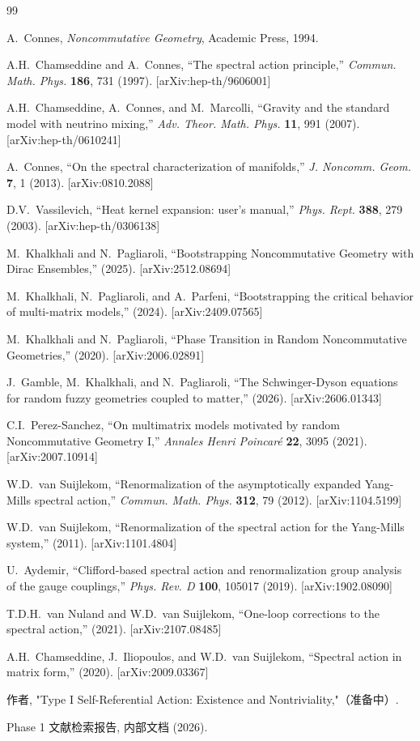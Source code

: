 \documentclass[11pt,a4paper]{ctexart}
\theoremstyle{remark}
\begin{document}
\begin{thebibliography}{99}

 A.~Connes, \textit{Noncommutative Geometry}, Academic Press, 1994.

 A.H.~Chamseddine and A.~Connes, ``The spectral action principle,'' \textit{Commun. Math. Phys.} \textbf{186}, 731 (1997). [arXiv:hep-th/9606001]

 A.H.~Chamseddine, A.~Connes, and M.~Marcolli, ``Gravity and the standard model with neutrino mixing,'' \textit{Adv. Theor. Math. Phys.} \textbf{11}, 991 (2007). [arXiv:hep-th/0610241]

 A.~Connes, ``On the spectral characterization of manifolds,'' \textit{J. Noncomm. Geom.} \textbf{7}, 1 (2013). [arXiv:0810.2088]

 D.V.~Vassilevich, ``Heat kernel expansion: user's manual,'' \textit{Phys. Rept.} \textbf{388}, 279 (2003). [arXiv:hep-th/0306138]

 M.~Khalkhali and N.~Pagliaroli, ``Bootstrapping Noncommutative Geometry with Dirac Ensembles,'' (2025). [arXiv:2512.08694]

 M.~Khalkhali, N.~Pagliaroli, and A.~Parfeni, ``Bootstrapping the critical behavior of multi-matrix models,'' (2024). [arXiv:2409.07565]

 M.~Khalkhali and N.~Pagliaroli, ``Phase Transition in Random Noncommutative Geometries,'' (2020). [arXiv:2006.02891]

 J.~Gamble, M.~Khalkhali, and N.~Pagliaroli, ``The Schwinger-Dyson equations for random fuzzy geometries coupled to matter,'' (2026). [arXiv:2606.01343]

 C.I.~Perez-Sanchez, ``On multimatrix models motivated by random Noncommutative Geometry I,'' \textit{Annales Henri Poincar\'e} \textbf{22}, 3095 (2021). [arXiv:2007.10914]

 W.D.~van Suijlekom, ``Renormalization of the asymptotically expanded Yang-Mills spectral action,'' \textit{Commun. Math. Phys.} \textbf{312}, 79 (2012). [arXiv:1104.5199]

 W.D.~van Suijlekom, ``Renormalization of the spectral action for the Yang-Mills system,'' (2011). [arXiv:1101.4804]

 U.~Aydemir, ``Clifford-based spectral action and renormalization group analysis of the gauge couplings,'' \textit{Phys. Rev. D} \textbf{100}, 105017 (2019). [arXiv:1902.08090]

 T.D.H.~van Nuland and W.D.~van Suijlekom, ``One-loop corrections to the spectral action,'' (2021). [arXiv:2107.08485]

 A.H.~Chamseddine, J.~Iliopoulos, and W.D.~van Suijlekom, ``Spectral action in matrix form,'' (2020). [arXiv:2009.03367]

 作者, "Type I Self-Referential Action: Existence and Nontriviality,"（准备中）.

 Phase 1 文献检索报告, 内部文档 (2026).

\end{thebibliography}
\end{document}
